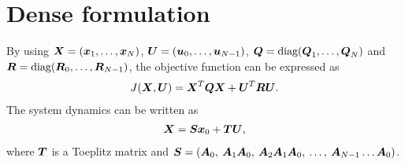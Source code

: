 \documentclass[12pt,a4paper]{article}
\newcommand{\mbm}[1]{\mbox{\boldmath $#1$}}
\begin{document}
\clearpage

\section{Dense formulation}

By using $\mbm{X} = (\mbm{x}_1,\dots,\mbm{x}_N)$, $\mbm{U} = (\mbm{u}_0,\dots,\mbm{u}_{N-1})$,
$\mbm{Q} = \mbox{diag}(\mbm{Q}_1,\dots,\mbm{Q}_N)$ and $\mbm{R} =
\mbox{diag}(\mbm{R}_{0},\dots,\mbm{R}_{N-1})$, the objective function can be expressed as
%
\begin{align}
J(\mbm{X},\mbm{U}) = \mbm{X}^T\mbm{Q}\mbm{X} + \mbm{U}^T\mbm{R}\mbm{U}. \label{eq:obj_1}
\end{align}
%
The system dynamics can be written as
%
\begin{align}
\mbm{X} = \mbm{S}\mbm{x}_0 + \mbm{T}\mbm{U}, \label{eq:recursive_dyn}
\end{align}
%
where $\mbm{T}$ is a Toeplitz matrix and 
$\mbm{S} = (\mbm{A}_0, \: \mbm{A}_1\mbm{A}_0, \: \mbm{A}_2\mbm{A}_1\mbm{A}_0, \: \dots, \: \mbm{A}_{N-1}\dots\mbm{A}_0)$.
%
\end{document}
